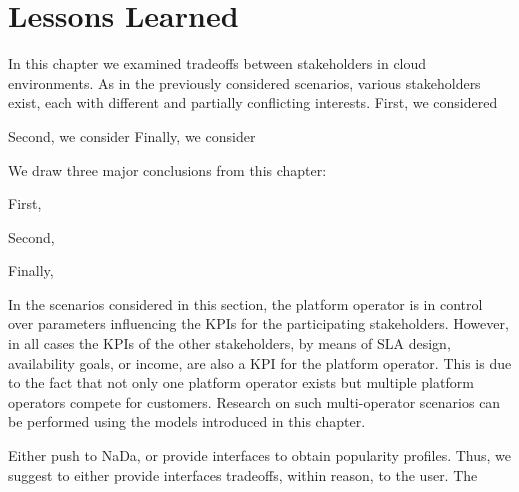 \section{Lessons Learned}\label{sec:cloud:lessons_learned}
In this chapter we examined tradeoffs between stakeholders in cloud environments.
As in the previously considered scenarios, various stakeholders exist, each with different and partially conflicting interests.
First, we considered

Second, we consider
Finally, we consider

We draw three major conclusions from this chapter:

First,

Second,

Finally,

In the scenarios considered in this section, the platform operator is in control over parameters influencing the \glspl{KPI} for the participating stakeholders.
However, in all cases the \glspl{KPI} of the other stakeholders, by means of \gls{SLA} design, availability goals, or income, are also a \gls{KPI} for the platform operator.
This is due to the fact that not only one platform operator exists but multiple platform operators compete for customers.
Research on such multi-operator scenarios can be performed using the models introduced in this chapter.

Either push to NaDa, or provide interfaces to obtain popularity profiles.
Thus, we suggest to either provide interfaces tradeoffs, within reason, to the user.
The 

